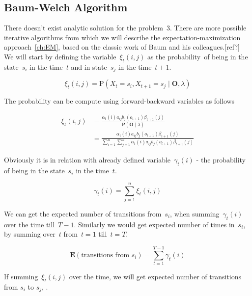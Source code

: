 \documentclass[thesis=M,english]{FITthesis}[2012/10/20]
\newcommand{\matr}[1]{\mathbf{#1}}
\begin{document}
\subsection{Baum-Welch Algorithm}\label{sec:BWA}

There doesn't exist analytic solution for the problem~3. There are more possible iterative algorithms from which we will describe the expectation-maximization approach~\ref{ch:EM}, based on the classic work of Baum and his colleagues.[ref?] We will start by defining the variable~$\xi_t(i,j)$ as the probability~of being in the state~$s_i$ in the time~$t$ and in state~$s_j$ in the time~$t+1$. 

\begin{equation}
\xi_t(i,j) = \mathrm{P}( X_t = s_i, X_{t+1} = s_j \mid \matr{O}, \lambda )  
\end{equation}

The probability can be compute using forward-backward variables as follows
 
\begin{equation}\label{eq:xi}
\begin{aligned}
\xi_t(i,j) &= \frac{ \alpha_t(i) a_{ij} b_j(o_{t+1}) \beta_{t+1}(j) }
		   		   { \mathrm{P}( \matr{O} \mid \lambda ) } \\
		   &= \frac{ \alpha_t(i) a_{ij} b_j(o_{t+1}) \beta_{t+1}(j) }
		   		   { \sum\limits_{i=1}^n \sum\limits_{j=1}^n \alpha_t(i) a_{ij} b_j(o_{t+1}) \beta_{t+1}(j) }
\end{aligned}
\end{equation}

Obviously it is in relation with already defined variable~$\gamma_t(i)$ - the probability of being in the state~$s_i$ in the time~$t$.

\begin{equation}
\gamma_t(i) = \sum_{j=1}^n \xi_t(i,j)  
\end{equation}

We can get the expected number of transitions from~$s_i$, when summing~$\gamma_t(i)$ over the time till~$T-1$. Similarly we would get expected number of times in~$s_i$, by summing over~$t$ from~$t=1$ till~$t=T$. 

\begin{equation}
\mathbf{E}(\text{transitions from $s_i$}) = \sum_{t=1}^{T-1} \gamma_t(i)  
\end{equation}

If summing~$\xi_t(i,j)$ over the time, we will get expected number of transitions from $s_i$ to $s_j$, . 
\end{document}
